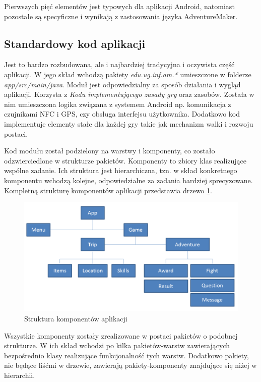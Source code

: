 \documentclass[openright]{xmgr}
\begin{document}
Pierwszych pięć elementów jest typowych dla aplikacji Android, natomiast pozostałe są specyficzne i wynikają z zastosowania języka AdventureMaker.

\subsection*{Standardowy kod aplikacji} 

Jest to bardzo rozbudowana, ale i najbardziej tradycyjna i oczywista część aplikacji. W jego skład wchodzą pakiety \textit{edu.ug.inf.am.*} umieszczone w folderze \textit{app/src/main/java}. Moduł jest odpowiedzialny za sposób działania i wygląd aplikacji. Korzysta z \textit{Kodu implementującego zasady gry} oraz zasobów. Została w nim umieszczona logika związana z systemem Android np. komunikacja z czujnikami NFC i GPS, czy obsługa interfejsu użytkownika. Dodatkowo kod implementuje elementy stałe dla każdej gry takie jak mechanizm walki i rozwoju postaci.

Kod modułu został podzielony na warstwy i komponenty, co zostało odzwierciedlone w strukturze pakietów. 
Komponenty to zbiory klas realizujące wspólne zadanie. Ich struktura jest hierarchiczna, tzn. w skład konkretnego komponentu wchodzą kolejne, odpowiedzialne za zadania bardziej sprecyzowane. Kompletną strukturę komponentów aplikacji przedstawia drzewo \ref{modules:tree}.

\begin{figure}[!tbh]
	\centering
	\includegraphics[width=1.0\hsize]{fig/modules_tree}
	\caption{Struktura komponentów aplikacji}
	\label{modules:tree}
\end{figure}

Wszystkie komponenty zostały zrealizowane w postaci pakietów o podobnej strukturze. W ich skład wchodzi po kilka pakietów-warstw zawierających bezpośrednio klasy realizujące funkcjonalność tych warstw. Dodatkowo pakiety, nie będące liśćmi w drzewie, zawierają pakiety-komponenty znajdujące się niżej w hierarchii.
\end{document}
